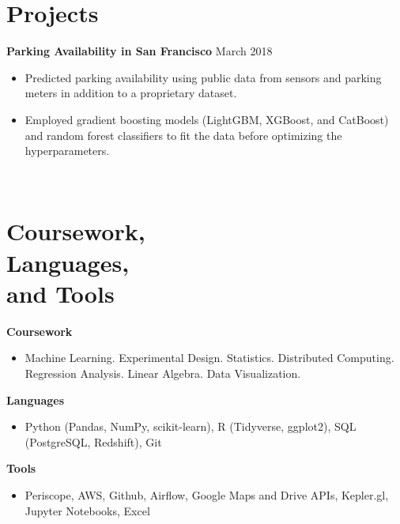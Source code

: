 \documentclass[line, margin]{res}
\begin{document}
\begin{resume}
\section{Projects}
	\textbf{Parking Availability in San Francisco} \hfill{March 2018}
	\begin{itemize}
		\item Predicted parking availability using public data from sensors and parking meters in addition to a proprietary dataset.
		\item Employed gradient boosting models (LightGBM, XGBoost, and CatBoost) and random forest classifiers to fit the data before optimizing the hyperparameters. %
	\end{itemize} \

 
\section{Coursework, \\ Languages, \\ and Tools} 
	\textbf{Coursework} \
	\begin{itemize}
		\item Machine Learning. Experimental Design. Statistics. Distributed Computing. Regression Analysis. Linear Algebra. Data Visualization. 
	\end{itemize}
	\textbf{Languages} \
	\begin{itemize}
		\item Python (Pandas, NumPy, scikit-learn), R (Tidyverse, ggplot2), SQL (PostgreSQL, Redshift), Git %
	\end{itemize} 
	\textbf{Tools} \
	\begin{itemize}
		\item Periscope, AWS, Github, Airflow, Google Maps and Drive APIs, Kepler.gl, Jupyter Notebooks, Excel
	\end{itemize}
		

\end{resume}
\end{document}
